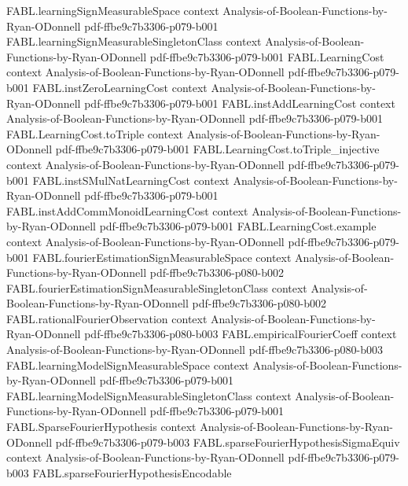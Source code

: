 \begin{theorem}
\proofstep
  {FABL.learningSignMeasurableSpace}
  {context}
  {Analysis-of-Boolean-Functions-by-Ryan-ODonnell}
  {pdf-ffbe9c7b3306-p079-b001}
\proofstep
  {FABL.learningSignMeasurableSingletonClass}
  {context}
  {Analysis-of-Boolean-Functions-by-Ryan-ODonnell}
  {pdf-ffbe9c7b3306-p079-b001}
\proofstep
  {FABL.LearningCost}
  {context}
  {Analysis-of-Boolean-Functions-by-Ryan-ODonnell}
  {pdf-ffbe9c7b3306-p079-b001}
\proofstep
  {FABL.instZeroLearningCost}
  {context}
  {Analysis-of-Boolean-Functions-by-Ryan-ODonnell}
  {pdf-ffbe9c7b3306-p079-b001}
\proofstep
  {FABL.instAddLearningCost}
  {context}
  {Analysis-of-Boolean-Functions-by-Ryan-ODonnell}
  {pdf-ffbe9c7b3306-p079-b001}
\proofstep
  {FABL.LearningCost.toTriple}
  {context}
  {Analysis-of-Boolean-Functions-by-Ryan-ODonnell}
  {pdf-ffbe9c7b3306-p079-b001}
\proofstep
  {FABL.LearningCost.toTriple_injective}
  {context}
  {Analysis-of-Boolean-Functions-by-Ryan-ODonnell}
  {pdf-ffbe9c7b3306-p079-b001}
\proofstep
  {FABL.instSMulNatLearningCost}
  {context}
  {Analysis-of-Boolean-Functions-by-Ryan-ODonnell}
  {pdf-ffbe9c7b3306-p079-b001}
\proofstep
  {FABL.instAddCommMonoidLearningCost}
  {context}
  {Analysis-of-Boolean-Functions-by-Ryan-ODonnell}
  {pdf-ffbe9c7b3306-p079-b001}
\proofstep
  {FABL.LearningCost.example}
  {context}
  {Analysis-of-Boolean-Functions-by-Ryan-ODonnell}
  {pdf-ffbe9c7b3306-p079-b001}
\proofstep
  {FABL.fourierEstimationSignMeasurableSpace}
  {context}
  {Analysis-of-Boolean-Functions-by-Ryan-ODonnell}
  {pdf-ffbe9c7b3306-p080-b002}
\proofstep
  {FABL.fourierEstimationSignMeasurableSingletonClass}
  {context}
  {Analysis-of-Boolean-Functions-by-Ryan-ODonnell}
  {pdf-ffbe9c7b3306-p080-b002}
\proofstep
  {FABL.rationalFourierObservation}
  {context}
  {Analysis-of-Boolean-Functions-by-Ryan-ODonnell}
  {pdf-ffbe9c7b3306-p080-b003}
\proofstep
  {FABL.empiricalFourierCoeff}
  {context}
  {Analysis-of-Boolean-Functions-by-Ryan-ODonnell}
  {pdf-ffbe9c7b3306-p080-b003}
\proofstep
  {FABL.learningModelSignMeasurableSpace}
  {context}
  {Analysis-of-Boolean-Functions-by-Ryan-ODonnell}
  {pdf-ffbe9c7b3306-p079-b001}
\proofstep
  {FABL.learningModelSignMeasurableSingletonClass}
  {context}
  {Analysis-of-Boolean-Functions-by-Ryan-ODonnell}
  {pdf-ffbe9c7b3306-p079-b001}
\proofstep
  {FABL.SparseFourierHypothesis}
  {context}
  {Analysis-of-Boolean-Functions-by-Ryan-ODonnell}
  {pdf-ffbe9c7b3306-p079-b003}
\proofstep
  {FABL.sparseFourierHypothesisSigmaEquiv}
  {context}
  {Analysis-of-Boolean-Functions-by-Ryan-ODonnell}
  {pdf-ffbe9c7b3306-p079-b003}
\proofstep
  {FABL.sparseFourierHypothesisEncodable}

\end{theorem}

